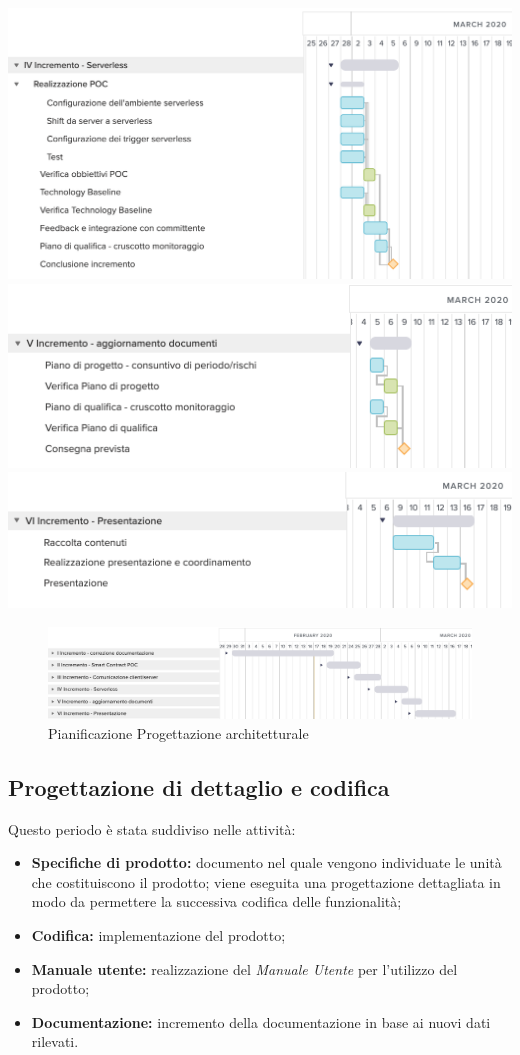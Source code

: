 	\includegraphics[width=\textwidth]{res/img/gantt/RP/4}
	\includegraphics[width=\textwidth]{res/img/gantt/RP/5}
	\includegraphics[width=\textwidth]{res/img/gantt/RP/6}
\begin{figure}[h!]
	\includegraphics[width=\textwidth]{res/img/gantt/RP/f}
	\caption{Pianificazione Progettazione architetturale}
\end{figure}
\newpage
\subsection{Progettazione di dettaglio e codifica}

\noindent Questo periodo è stata suddiviso nelle attività:
\begin{itemize}
	\item \textbf{Specifiche di prodotto:} documento nel quale vengono individuate le unità che costituiscono il prodotto; viene eseguita una progettazione dettagliata in modo da permettere la successiva codifica delle funzionalità;
	\item  \textbf{Codifica:} implementazione del prodotto;
	\item \textbf{Manuale utente:} realizzazione del \textit{Manuale Utente} per l'utilizzo del prodotto;
	\item \textbf{Documentazione:} incremento della documentazione in base ai nuovi dati rilevati.
\end{itemize}
